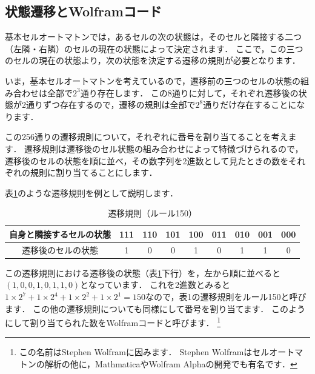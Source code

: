 \documentclass[dvipdfmx]{jsarticle}
\theoremstyle{definition}
\begin{document}
\subsection{状態遷移とWolframコード}

基本セルオートマトンでは，あるセルの次の状態は，そのセルと隣接する二つ（左隣・右隣）のセルの現在の状態によって決定されます．
ここで，この三つのセルの現在の状態より，次の状態を決定する遷移の規則が必要となります．

いま，基本セルオートマトンを考えているので，遷移前の三つのセルの状態の組み合わせは全部で$2^3$通り存在します．
この8通りに対して，それぞれ遷移後の状態が2通りずつ存在するので，遷移の規則は全部で$2^8$通りだけ存在することになります．

この256通りの遷移規則について，それぞれに番号を割り当てることを考えます．
遷移規則は遷移後のセル状態の組み合わせによって特徴づけられるので，遷移後のセルの状態を順に並べ，その数字列を2進数として見たときの数をそれぞれの規則に割り当てることにします．

表\ref{tab_transrule_150}のような遷移規則を例として説明します．

\begin{table}[ht]
\begin{center}
\begin{tabular}{|c||c|c|c|c|c|c|c|c|} \hline
    自身と隣接するセルの状態 & 111 & 110 & 101 & 100 & 011 & 010 & 001 & 000 \\ \hline
    遷移後のセルの状態      &  1  &  0  &  0  &  1  &  0  &  1  &  1  &  0  \\ \hline
\end{tabular}
\end{center}
\caption{遷移規則（ルール150）}
\label{tab_transrule_150}
\end{table}

この遷移規則における遷移後の状態（表\ref{tab_transrule_150}下行）を，左から順に並べると$(1, 0, 0, 1, 0, 1, 1, 0)$となっています．
これを2進数とみると$1\times 2^7 + 1\times 2^4 + 1\times 2^2 + 1\times 2^1 = 150$なので，表1の遷移規則をルール150と呼びます．
この他の遷移規則についても同様にして番号を割り当てます．
このようにして割り当てられた数をWolframコードと呼びます．
\footnote{
この名前はStephen Wolframに因みます．
Stephen Wolframはセルオートマトンの解析の他に，MathmaticaやWolfram Alpha\cite{wolalp}の開発でも有名です．
}
\end{document}
